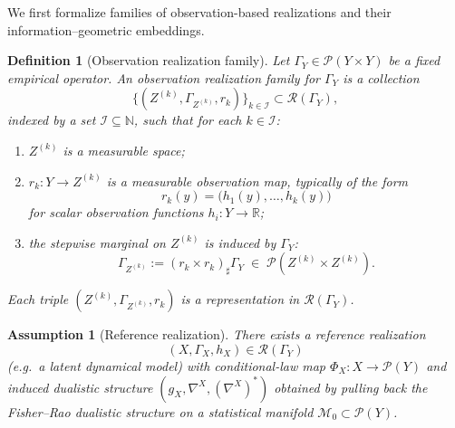 \documentclass[11pt]{article}
\newtheorem{definition}{Definition}
\newtheorem{assumption}{Assumption}
\newcommand{\Pcal}{\mathcal{P}}
\begin{document}
We first formalize families of observation-based realizations and their
information--geometric embeddings.

\begin{definition}[Observation realization family]
\label{def:observation-realization-family}
Let $\Gamma_Y \in \Pcal(Y\times Y)$ be a fixed empirical operator.
An \emph{observation realization family} for $\Gamma_Y$ is a collection
\[
  \bigl\{(Z^{(k)},\Gamma_{Z^{(k)}},r_k)\bigr\}_{k\in\mathcal I}
  \subset \mathcal{R}(\Gamma_Y),
\]
indexed by a set $\mathcal I \subseteq \mathbb N$, such that for each
$k\in\mathcal I$:
\begin{enumerate}[label=(O\arabic*),leftmargin=1.8em]
  \item $Z^{(k)}$ is a measurable space;
  \item $r_k : Y \to Z^{(k)}$ is a measurable \emph{observation map},
  typically of the form
  \[
    r_k(y)
    = \bigl(h_1(y),\dots,h_k(y)\bigr)
  \]
  for scalar observation functions $h_i:Y\to\mathbb R$;
  \item the stepwise marginal on $Z^{(k)}$ is induced by $\Gamma_Y$:
  \[
    \Gamma_{Z^{(k)}} := (r_k\times r_k)_{\sharp}\Gamma_Y
    \;\in\; \Pcal(Z^{(k)}\times Z^{(k)}).
  \]
\end{enumerate}
Each triple $(Z^{(k)},\Gamma_{Z^{(k)}},r_k)$ is a representation in
$\mathcal R(\Gamma_Y)$.
\end{definition}

\begin{assumption}[Reference realization]
\label{ass:reference-realization}
There exists a \emph{reference realization}
\[
  (X,\Gamma_X,h_X) \in \mathcal{R}(\Gamma_Y)
\]
(e.g.\ a latent dynamical model) with conditional-law map
$\Phi_X : X \to \Pcal(Y)$ and induced dualistic structure
$(g_X,\nabla^X,(\nabla^X)^\ast)$ obtained by pulling back the
Fisher--Rao dualistic structure on a statistical manifold
$\mathcal M_0 \subset \Pcal(Y)$.
\end{assumption}
\end{document}
